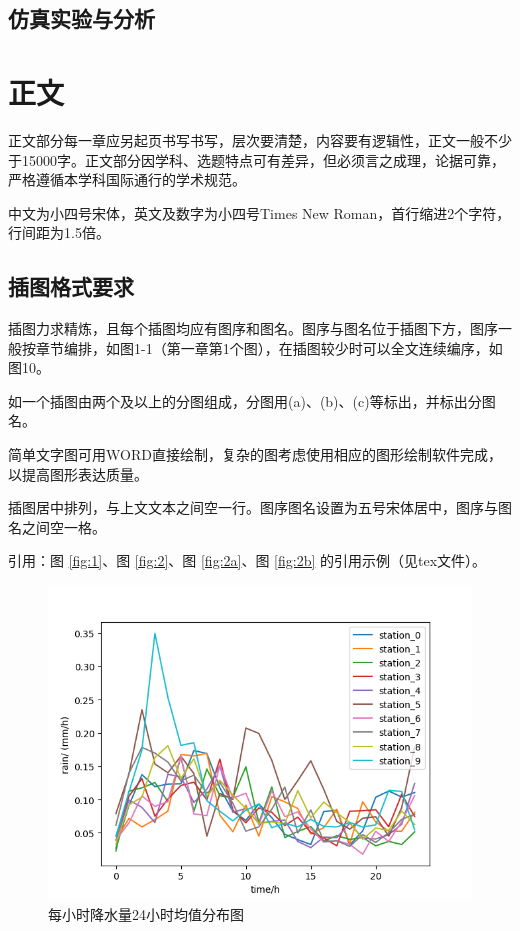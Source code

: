 \documentclass{seuthesis-2022}
\numberwithin{equation}{section}
\begin{document}
\section{仿真实验与分析}





\chapter{正文}
正文部分每一章应另起页书写书写，层次要清楚，内容要有逻辑性，正文一般不少于15000字。正文部分因学科、选题特点可有差异，但必须言之成理，论据可靠，严格遵循本学科国际通行的学术规范。

中文为小四号宋体，英文及数字为小四号Times New Roman，首行缩进2个字符，行间距为1.5倍。

\section{插图格式要求}
插图力求精炼，且每个插图均应有图序和图名。图序与图名位于插图下方，图序一般按章节编排，如图1-1（第一章第1个图），在插图较少时可以全文连续编序，如图10。

如一个插图由两个及以上的分图组成，分图用(a)、(b)、(c)等标出，并标出分图名。

简单文字图可用WORD直接绘制，复杂的图考虑使用相应的图形绘制软件完成，以提高图形表达质量。

插图居中排列，与上文文本之间空一行。图序图名设置为五号宋体居中，图序与图名之间空一格。

引用：图 \ref{fig:1}、图 \ref{fig:2}、图 \ref{fig:2a}、图 \ref{fig:2b} 的引用示例（见tex文件）。

\begin{figure}[H]
    \centering
    \includegraphics[width=0.5\linewidth]{fig/降水量均值分布图.png}
    \caption{每小时降水量24小时均值分布图}
    \label{fig:100}
\end{figure}
\end{document}
